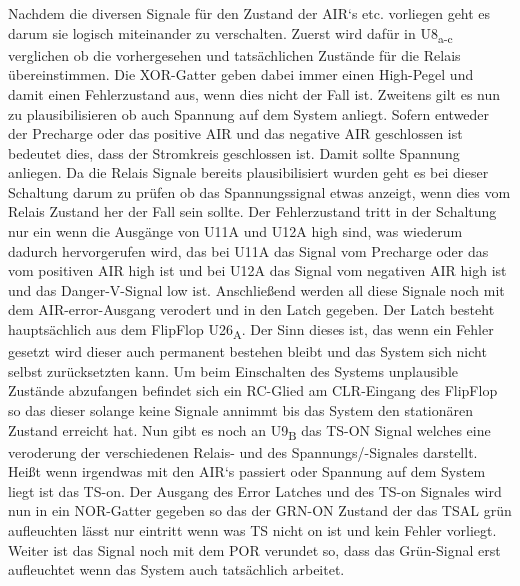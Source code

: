 Nachdem die diversen Signale für den Zustand der \ac{AIR}`s etc. vorliegen geht es darum sie logisch miteinander zu verschalten. Zuerst wird dafür in U8\textsubscript{a-c} verglichen ob die vorhergesehen und tatsächlichen Zustände für die Relais übereinstimmen. Die XOR-Gatter geben dabei immer einen High-Pegel und damit einen Fehlerzustand aus, wenn dies nicht der Fall ist. Zweitens gilt es nun zu plausibilisieren ob auch Spannung auf dem System anliegt. Sofern entweder der Precharge oder das positive \ac{AIR} und das negative \ac{AIR} geschlossen ist bedeutet dies, dass der Stromkreis geschlossen ist. Damit sollte Spannung anliegen. Da die Relais Signale bereits plausibilisiert wurden geht es bei dieser Schaltung darum zu prüfen ob das Spannungssignal etwas anzeigt, wenn dies vom Relais Zustand her der Fall sein sollte. Der Fehlerzustand tritt in der Schaltung nur ein wenn die Ausgänge von U11A und U12A high sind, was wiederum dadurch hervorgerufen wird, das bei U11A das Signal vom Precharge oder das vom positiven \ac{AIR} high ist und bei U12A das Signal vom negativen \ac{AIR} high ist und das Danger-V-Signal low ist. Anschließend werden all diese Signale noch mit dem \ac{AIR}-error-Ausgang verodert und in den Latch gegeben. Der Latch besteht hauptsächlich aus dem FlipFlop U26\textsubscript{A}. Der Sinn dieses ist, das wenn ein Fehler gesetzt wird dieser auch permanent bestehen bleibt und das System sich nicht selbst zurücksetzten kann. Um beim Einschalten des Systems unplausible Zustände abzufangen befindet sich ein RC-Glied am CLR-Eingang des FlipFlop so das dieser solange keine Signale annimmt bis das System den stationären Zustand erreicht hat. Nun gibt es noch an U9\textsubscript{B} das \ac{TS}-ON Signal welches eine veroderung der verschiedenen Relais- und des Spannungs/-Signales darstellt. Heißt wenn irgendwas mit den \ac{AIR}`s passiert oder Spannung auf dem System liegt ist das \ac{TS}-on. Der Ausgang des Error Latches und des \ac{TS}-on Signales wird nun in ein NOR-Gatter gegeben so das der GRN-ON Zustand der das \ac{TSAL} grün aufleuchten lässt nur eintritt wenn was \ac{TS} nicht on ist und kein Fehler vorliegt. Weiter ist das Signal noch mit dem \ac{POR} verundet so, dass das Grün-Signal erst aufleuchtet wenn das System auch tatsächlich arbeitet.

